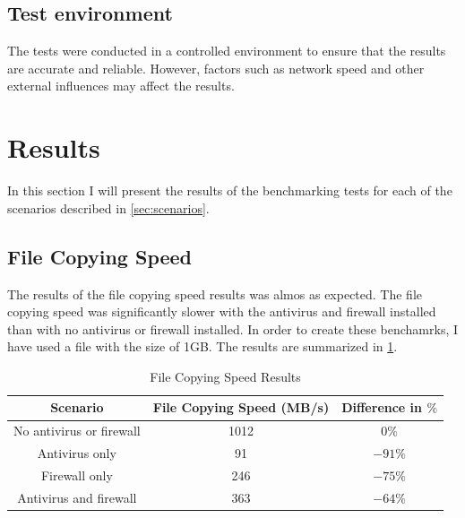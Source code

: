 \documentclass[runningheads,a4paper,english]{llncs}[2022/01/12]
\begin{document}
\subsection{Test environment}
\label{sec:environment}

\par The tests were conducted in a controlled environment to ensure that the
results are accurate and reliable. However, factors such as network speed and
other external influences may affect the results.


\section{Results}
\label{sec:results}

\par In this section I will present the results of the benchmarking tests for
each of the scenarios described in \cref{sec:scenarios}.

\subsection{File Copying Speed}
\label{sec:copying}

\par The results of the file copying speed results was almos as expected. The
file copying speed was significantly slower with the antivirus and firewall
installed than with no antivirus or firewall installed. In order to create
these benchamrks, I have used a file with the size of 1GB.  The results are
summarized in \cref{tab:filecopy}.

\begin{table}[h]
\centering
  \begin{tabular}{|c|c|c|}
    \hline
    Scenario & File Copying Speed (MB/s) & Difference in $\%$ \\
    \hline
    No antivirus or firewall & 1012 & $0\%$ \\
    Antivirus only & 91 & $-91\%$ \\
    Firewall only & 246  & $-75\%$ \\
    Antivirus and firewall & 363 & $-64\%$ \\
    \hline
  \end{tabular}
  \caption{File Copying Speed Results}
  \label{tab:filecopy}
\end{table}
\end{document}
